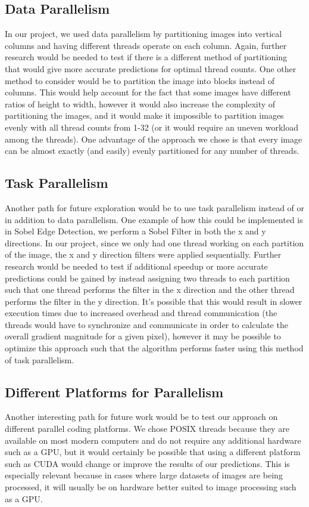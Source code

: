 \documentclass{article}
\begin{document}
    \subsection{Data Parallelism}
    In our project, we used data parallelism by partitioning images into vertical columns and having different threads operate on each column. Again, further research would be needed to test if there is a different method of partitioning that would give more accurate predictions for optimal thread counts. One other method to consider would be to partition the image into blocks instead of columns. This would help account for the fact that some images have different ratios of height to width, however it would also increase the complexity of partitioning the images, and it would make it impossible to partition images evenly with all thread counts from 1-32 (or it would require an uneven workload among the threads). One advantage of the approach we chose is that every image can be almost exactly (and easily) evenly partitioned for any number of threads.
    
    \subsection{Task Parallelism}
    Another path for future exploration would be to use task parallelism instead of or in addition to data parallelism. One example of how this could be implemented is in Sobel Edge Detection, we perform a Sobel Filter in both the x and y directions. In our project, since we only had one thread working on each partition of the image, the x and y direction filters were applied sequentially. Further research would be needed to test if additional speedup or more accurate predictions could be gained by instead assigning two threads to each partition such that one thread performs the filter in the x direction and the other thread performs the filter in the y direction. It's possible that this would result in slower execution times due to increased overhead and thread communication (the threads would have to synchronize and communicate in order to calculate the overall gradient magnitude for a given pixel), however it may be possible to optimize this approach such that the algorithm performs faster using this method of task parallelism.
    
    \subsection{Different Platforms for Parallelism}
    Another interesting path for future work would be to test our approach on different parallel coding platforms. We chose POSIX threads because they are available on most modern computers and do not require any additional hardware such as a GPU, but it would certainly be possible that using a different platform such as CUDA would change or improve the results of our predictions. This is especially relevant because in cases where large datasets of images are being processed, it will usually be on hardware better suited to image processing such as a GPU.
\end{document}
